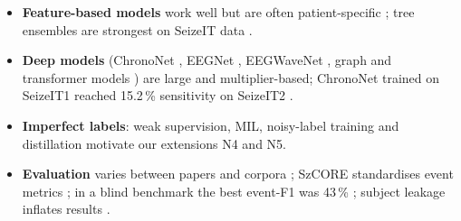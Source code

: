 \begin{itemize}
\item \textbf{Feature-based models} work well but are often patient-specific \cite{shoeb2010icml}; tree ensembles are
  strongest on SeizeIT data \cite{alhussaini2023seizft,huang2023lightweight}.
\item \textbf{Deep models} (ChronoNet \cite{roy2019chrononet}, EEGNet \cite{lawhern2018eegnet}, EEGWaveNet
  \cite{thuwajit2022eegwavenet}, graph and transformer models \cite{tang2022gnnssl,wu2025seizuretransformer,yang2023biot})
  are large and multiplier-based; ChronoNet trained on SeizeIT1 reached 15.2\,\% sensitivity on SeizeIT2
  \cite{huang2023lightweight}.
\item \textbf{Imperfect labels}: weak supervision, MIL, noisy-label training and distillation
  \cite{saab2020weak,isaev2020mil,shama2026bundl,zheng2023kdgnn} motivate our extensions N4 and N5.
\item \textbf{Evaluation} varies between papers and corpora \cite{ziyabari2017metrics,shah2018tusz}; SzCORE standardises event metrics
  \cite{dan2024szcore}; in a blind benchmark the best event-F1 was 43\,\% \cite{dan2025szcorechallenge}; subject leakage
  inflates results \cite{brookshire2024leakage}.
\end{itemize}

